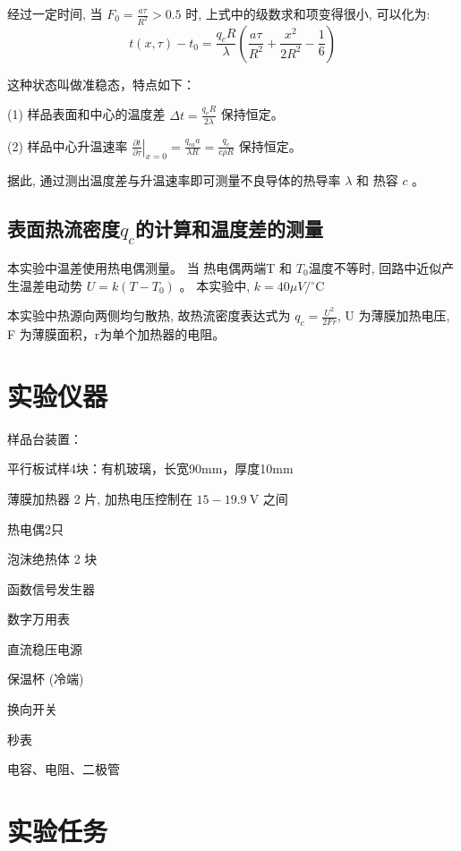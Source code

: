 \documentclass[UTF8]{ctexart}
\begin{document}
    经过一定时间, 当 $ F_{0}=\frac{a \tau}{R^{2}}>0.5 $ 时, 上式中的级数求和项变得很小, 可以化为:
    $$
    t(x, \tau)-t_{0}=\frac{q_{c} R}{\lambda}\left(\frac{a \tau}{R^{2}}+\frac{x^{2}}{2 R^{2}}-\frac{1}{6}\right)
    $$

    这种状态叫做准稳态，特点如下：
    
    (1) 样品表面和中心的温度差  $\Delta t=\frac{q_{\mathrm{e}} R}{2 \lambda}$  保持恒定。
    
    (2) 样品中心升温速率 $ \left.\frac{\partial t}{\partial \tau}\right|_{x=0}=\frac{q_{c a} a }{\lambda R}=\frac{q_{c}}{c \rho R} $ 保持恒定。
    
    据此, 通过测出温度差与升温速率即可测量不良导体的热导率 $ \lambda $ 和 热容  $c$  。

    \subsection {表面热流密度$q_c$的计算和温度差的测量} 
     本实验中温差使用热电偶测量。  当 热电偶两端T 和 $T_{0} $温度不等时, 回路中近似产生温差电动势  $U = k\left(T-T_{0}\right)$ 。  
    本实验中,  $k = 40 \mu V /{ }^{\circ} \mathrm{C}$  
 
    本实验中热源向两侧均匀散热, 故热流密度表达式为 $ q_{c} = \frac{U^{2}}{2 F r}$, U 为薄膜加热电压,  F  为薄膜面积，r为单个加热器的电阻。 

    \section{实验仪器}
    \noindent 样品台装置：

    平行板试样4块：有机玻璃，长宽90mm，厚度10mm
    
    薄膜加热器 2 片, 加热电压控制在  $15-19.9 \mathrm{~V}$  之间

    热电偶2只

    泡沫绝热体 2 块

    \noindent 函数信号发生器

    \noindent 数字万用表

    \noindent 直流稳压电源

    \noindent 保温杯 (冷端)

    \noindent 换向开关

    \noindent 秒表

    \noindent 电容、电阻、二极管

    \section{实验任务}
\end{document}
